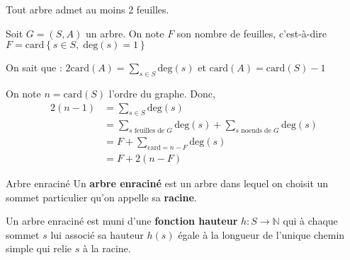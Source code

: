 \begin{Corollary}{}{}
Tout arbre admet au moins 2 feuilles.
\end{Corollary}

\begin{myproof}
  Soit $G = (S,A)$ un arbre. On note $F$ son nombre de feuilles, c'est-à-dire $F = \mathrm{card} \left\{ s \in S,\; \mathrm{deg}(s) = 1  \right\}$  

  On sait que : $2 \mathrm{card} (A) = \sum _{s \in S} \mathrm{deg} (s)$ et $\mathrm{card} (A) = \mathrm{card} (S) -1$

  On note $n = \mathrm{card} (S)$ l'ordre du graphe. Donc, 
  \begin{align*}
    2(n-1) &= \sum _{s \in S} \mathrm{deg} (s) \\ 
           &= \sum _{s \text{ feuilles de }G} \mathrm{deg} (s) +  \sum _{s \text{ noeuds de }G} \mathrm{deg} (s) \\ 
           &= F + \sum _{\mathrm{card} = n-F}  \mathrm{deg} (s) \\ 
           &= F + 2(n-F)
  \end{align*}
\end{myproof}

\begin{Definition}[colbacktitle=red!75!black]{Arbre enraciné}{}
Un \textbf{arbre enraciné} est un arbre dans lequel on choisit un sommet particulier qu'on appelle sa \textbf{racine}.

Un arbre enraciné est muni d'une \textbf{fonction hauteur} $h : S \to \mathbb{N}$ qui à chaque sommet $s$ lui associé sa hauteur $h(s)$ égale à la longueur de l'unique chemin simple qui relie $s$ à la racine.
\end{Definition}


